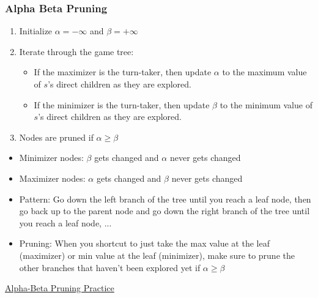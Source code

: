 \subsubsection{Alpha Beta Pruning}
\begin{process}
    \begin{enumerate}
        \item Initialize $\alpha = -\infty$ and $\beta = +\infty$
        \item Iterate through the game tree:
        \begin{itemize}
            \item If the maximizer is the turn-taker, then update $\alpha$ to the maximum value of $s$'s direct children as they are explored.
            \item If the minimizer is the turn-taker, then update $\beta$ to the minimum value of $s$'s direct children as they are explored.
        \end{itemize}
        \item Nodes are pruned if $\alpha \geq \beta$
    \end{enumerate}
\end{process}

\begin{warning}
    \begin{itemize}
        \item Minimizer nodes: $\beta$ gets changed and $\alpha$ never gets changed
        \item Maximizer nodes: $\alpha$ gets changed and $\beta$ never gets changed
        \item Pattern: Go down the left branch of the tree until you reach a leaf node, then go back up to the parent node and go down the right branch of the tree until you reach a leaf node, ...
        \item Pruning: When you shortcut to just take the max value at the leaf (maximizer) or min value at the leaf (minimizer), make sure to prune the other branches that haven't been explored yet if $\alpha \geq \beta$
    \end{itemize}

\end{warning}
\newpage

\begin{example} \href{https://pascscha.ch/info2/abTreePractice/}{Alpha-Beta Pruning Practice}
\end{example}

\begin{example}
\end{example}
\newpage

\begin{example}
\end{example}